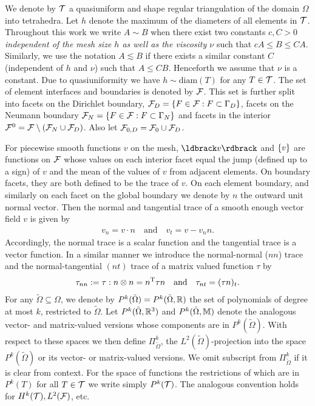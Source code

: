  
We denote by $\mathcal{T}$ a quasiuniform and shape regular triangulation of
the domain $\Omega$ into tetrahedra. Let $h$ denote the maximum of the
diameters of all elements in $\mathcal{T}$. Throughout this work we write $A
\sim B$ when there exist two constants $c,C >0$ {\em independent of
the mesh size $h$ as well as the viscosity $\nu$} such that $cA \le B
\le C A$. Similarly, we use the notation $A \lesssim B$ if there
exists a similar constant $C$  (independent of $h$ and $\nu$) such
that $A \le CB$. Henceforth we assume that $\nu$ is a constant. Due to
quasiuniformity we have $h \sim \textrm{diam}(T)$ for any $ T\in
\mathcal{T}$. The set of element interfaces and boundaries is denoted by
$\mathcal{F}$. 
{This set is further split into facets on the
  Dirichlet  boundary,
  $\mathcal{F}_D = \{ F \in \mathcal{F}: F \subset \Gamma_D\}$,
  facets on the  Neumann boundary $
  \mathcal{F}_N = \{ F \in \mathcal{F} : F \subset \Gamma_N\}$ and
  facets in the interior $\mathcal{F}^{0} = \mathcal{F} \setminus ( \mathcal{F}_N  \cup \mathcal{F}_D)$.
  Also let $\mathcal{F}_{0, D}  = \mathcal{F}_0 \cup \mathcal{F}_D$.}

For piecewise smooth functions $v$ on the mesh, $\jump{v}$ and
$\{ v \}$ are functions on $\mathcal{F}$ whose values on each interior
facet equal the jump (defined up to a sign) of $v$ and the mean of the
values of $v$ from adjacent elements. On boundary facets, they are
both  defined to be the trace of $v$. On each element boundary, and
similarly on each facet on the global boundary we denote by $n$ the
outward unit normal vector. Then the normal and tangential trace of a
smooth enough  vector field $v$ is given by 
\begin{align*}
 v_n = v\cdot n \quad \textrm{and} \quad v_t = v - v_n n.
\end{align*}
Accordingly, the normal trace is a scalar function and
the tangential trace is a vector function. In a similar manner we
introduce the normal-normal ($nn$) trace
and the normal-tangential $(nt)$ trace of a
matrix valued function $\tau$ by
\begin{align*}
  \tau_{nn} := \tau : n \otimes n  = n^{\operatorname{T}} \tau n \quad \textrm{and} \quad \tau_{nt} = (\tau n)_t.
\end{align*} 
For any $\tilde{\Omega} \subseteq \Omega$, we denote by
$P^k(\tilde{\Omega}) = P^k(\tilde{\Omega},\mathbb{R}) $ the set of polynomials of degree at
most $k$, restricted to $\tilde{\Omega}$.
Let $P^k(\tilde{\Omega},\mathbb{R}^3)$ and $P^k(\tilde{\Omega},\mathbb{M})$ denote the
analogous vector- and matrix-valued versions whose components are in
$P^k(\tilde{\Omega})$. With respect to these spaces we then define
$\Pi^k_{\tilde{\Omega}}$, the $L^2(\tilde{\Omega})$-projection into the space
$P^k(\tilde{\Omega})$ or its vector- or matrix-valued versions.
We omit
subscript from $\Pi^k_{\tilde{\Omega}}$  if it is clear from 
context. For the space of functions the restrictions of which are in
$P^k(T)$ for all $T\in\mathcal{T}$ we write simply $P^k(\mathcal{T})$. The
analogous convention holds for $H^k(\mathcal{T}), L^2(\mathcal{F})$, etc. 

